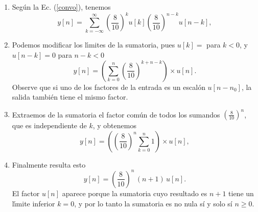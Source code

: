 \begin{enumerate}
\item Seg\'{u}n la Ec. (\ref{convo}), tenemos
  \begin{equation}
    y\left[ n\right] =
    \sum_{k=-\infty }^{\infty }
    \left( \frac{8}{10}\right)^{k} u\left[ k\right] 
    \left( \frac{8}{10}\right)^{n-k} u\left[ n-k\right] ,
  \end{equation}

\item Podemos modificar los l\'{\i}mites de la sumatoria, pues $u[k] =
  $ para $k < 0$, y $u[n-k] = 0$ para $n - k < 0$
  \begin{equation}
    y\left[ n\right] = (\sum_{k=0}^{n }\left( \frac{8}{10}\right) ^{k+n-k}) \times u[n].
  \end{equation}
   Observe que si uno de los factores de la entrada es un escalón $u[n - n_{0}]$, la salida también tiene el mismo factor.
   
\item Extraemos de la sumatoria el factor com\'{u}n de todos los
  sumandos $(\frac{8}{10})^{n}$, que es independiente de $k$, y obtenemos
  \begin{equation}
    y\left[ n\right] = \left(\left( \frac{8}{10}\right) ^{n} \sum_{k=0}^{n} 1\right) \times u[n],
  \end{equation}

\item Finalmente resulta esto
  \begin{equation}
    y\left[ n\right] = \left( \frac{8}{10}\right) ^{n} \, \left(n+1
    \right) \, u[n].
  \end{equation}
  El factor $u[n]$ aparece porque la sumatoria cuyo resultado es $n +
  1$ tiene un l\'{\i}mite inferior $k = 0$, y por lo tanto la sumatoria es no nula sí y solo sí $n \geq 0$.
\end{enumerate}
